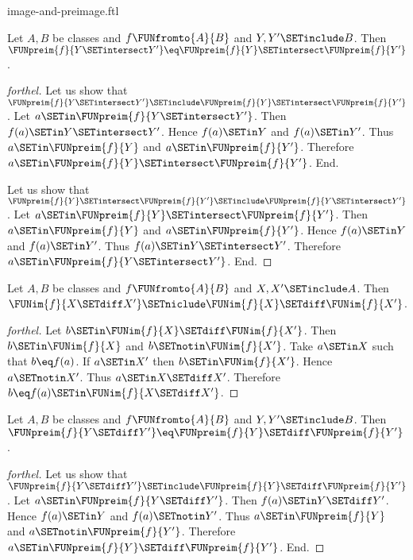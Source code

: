 \documentclass{stex}
\begin{document}
\begin{smodule}{image-and-preimage.ftl}
\begin{proposition}[forthel,id=FOUNDATIONS_07_4021844428455936]
  Let $A, B$ be classes and $f \FUNfromto{A}{B}$ and $Y, Y' \SETinclude B$.
  Then $\FUNpreim{f}{Y \SETintersect Y'} \eq \FUNpreim{f}{Y} \SETintersect \FUNpreim{f}{Y'}$.
\end{proposition}
\begin{proof}[forthel]
  Let us show that $\FUNpreim{f}{Y \SETintersect Y'} \SETinclude \FUNpreim{f}{Y} \SETintersect \FUNpreim{f}{Y'}$.
    Let $a \SETin \FUNpreim{f}{Y \SETintersect Y'}$.
    Then $f(a) \SETin Y \SETintersect Y'$.
    Hence $f(a) \SETin Y$ and $f(a) \SETin Y'$.
    Thus $a \SETin \FUNpreim{f}{Y}$ and $a \SETin \FUNpreim{f}{Y'}$.
    Therefore $a \SETin \FUNpreim{f}{Y} \SETintersect \FUNpreim{f}{Y'}$.
  End.

  Let us show that $\FUNpreim{f}{Y} \SETintersect \FUNpreim{f}{Y'} \SETinclude \FUNpreim{f}{Y \SETintersect Y'}$.
    Let $a \SETin \FUNpreim{f}{Y} \SETintersect \FUNpreim{f}{Y'}$.
    Then $a \SETin \FUNpreim{f}{Y}$ and $a \SETin \FUNpreim{f}{Y'}$.
    Hence $f(a) \SETin Y$ and $f(a) \SETin Y'$.
    Thus $f(a) \SETin Y \SETintersect Y'$.
    Therefore $a \SETin \FUNpreim{f}{Y \SETintersect Y'}$.
  End.
\end{proof}

\begin{proposition}[forthel,id=FOUNDATIONS_07_8372256617005056]
  Let $A, B$ be classes and $f \FUNfromto{A}{B}$ and $X, X' \SETinclude A$.
  Then $\FUNim{f}{X \SETdiff X'} \SETniclude \FUNim{f}{X} \SETdiff \FUNim{f}{X'}$.
\end{proposition}
\begin{proof}[forthel]
  Let $b \SETin \FUNim{f}{X} \SETdiff \FUNim{f}{X'}$.
  Then $b \SETin \FUNim{f}{X}$ and $b \SETnotin \FUNim{f}{X'}$.
  Take $a \SETin X$ such that $b \eq f(a)$.
  If $a \SETin X'$ then $b \SETin \FUNim{f}{X'}$.
  Hence $a \SETnotin X'$.
  Thus $a \SETin X \SETdiff X'$.
  Therefore $b \eq f(a) \SETin \FUNim{f}{X \SETdiff X'}$.
\end{proof}

\begin{proposition}[forthel,id=FOUNDATIONS_07_6552168641331200]
  Let $A, B$ be classes and $f \FUNfromto{A}{B}$ and $Y, Y' \SETinclude B$.
  Then $\FUNpreim{f}{Y \SETdiff Y'} \eq \FUNpreim{f}{Y} \SETdiff \FUNpreim{f}{Y'}$.
\end{proposition}
\begin{proof}[forthel]
  Let us show that $\FUNpreim{f}{Y \SETdiff Y'} \SETinclude \FUNpreim{f}{Y} \SETdiff \FUNpreim{f}{Y'}$.
    Let $a \SETin \FUNpreim{f}{Y \SETdiff Y'}$.
    Then $f(a) \SETin Y \SETdiff Y'$.
    Hence $f(a) \SETin Y$ and $f(a) \SETnotin Y'$.
    Thus $a \SETin \FUNpreim{f}{Y}$ and $a \SETnotin \FUNpreim{f}{Y'}$.
    Therefore $a \SETin \FUNpreim{f}{Y} \SETdiff \FUNpreim{f}{Y'}$.
  End.


\end{proof}
\end{smodule}
\end{document}
